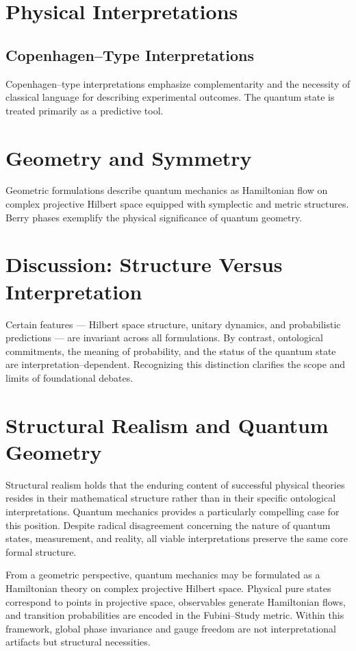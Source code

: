 \section{Physical Interpretations}

\subsection{Copenhagen--Type Interpretations}

Copenhagen--type interpretations emphasize complementarity and the necessity 
of classical language for describing experimental outcomes. The quantum 
state is treated primarily as a predictive tool.

\section{Geometry and Symmetry}

Geometric formulations describe quantum mechanics as Hamiltonian flow on 
complex projective Hilbert space equipped with symplectic and metric structures.
Berry phases exemplify the physical significance of quantum geometry.

\section{Discussion: Structure Versus Interpretation}

Certain features --- Hilbert space structure, unitary dynamics, and probabilistic 
predictions --- are invariant across all formulations. By contrast, ontological 
commitments, the meaning of probability, and the status of the quantum state are 
interpretation--dependent. Recognizing this distinction clarifies the scope and 
limits of foundational debates.
\section{Structural Realism and Quantum Geometry}

Structural realism holds that the enduring content of successful physical theories resides
in their mathematical structure rather than in their specific ontological interpretations.
Quantum mechanics provides a particularly compelling case for this position.
Despite radical disagreement concerning the nature of quantum states, 
measurement, and reality, all viable interpretations preserve the same core formal structure.

From a geometric perspective, quantum mechanics may be formulated as a Hamiltonian theory
on complex projective Hilbert space. Physical pure states correspond to points in projective
space, observables generate Hamiltonian flows, and transition probabilities are encoded 
in the Fubini--Study metric. Within this framework, global phase invariance and gauge 
freedom are not interpretational artifacts but structural necessities.


